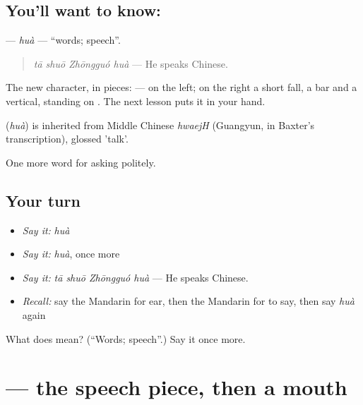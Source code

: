 \subsection*{You'll want to know: }
\textbf{} — \emph{huà} — \textquotedblleft{}words; speech\textquotedblright{}.

\begin{quote}
\textbf{} \emph{tā shuō Zhōngguó huà} — He speaks Chinese.
\end{quote}

The new character, in pieces:  —  on the left; on the right a short fall, a bar and a vertical, standing on . The next lesson puts it in your hand.

\begin{cousinweb}
\textbf{} (\emph{huà}) is inherited from Middle Chinese \emph{hwaejH} (Guangyun, in Baxter's transcription), glossed 'talk'.
\end{cousinweb}

\begin{grammarlens}[title={What you've built}]
One more word for asking politely.
\end{grammarlens}

\subsection*{Your turn}
\begin{itemize}
\raggedright
  \item \emph{Say it:} \emph{huà}
  \item \emph{Say it:} \emph{huà}, once more
  \item \emph{Say it:} \emph{tā shuō Zhōngguó huà} — He speaks Chinese.
  \item \emph{Recall:} say the Mandarin for ear, then the Mandarin for to say, then say \emph{huà} again
\end{itemize}

\begin{tcolorbox}[breakable,colback=teal!4,colframe=teal!35!black,title={Before you move on}]
What does  mean? (\textquotedblleft{}Words; speech\textquotedblright{}.) Say it once more.
\end{tcolorbox}
\section[\texorpdfstring{\zh{话} (huà)}{话 (huà)}]{ — the speech piece, then a mouth}

